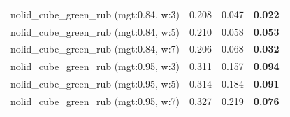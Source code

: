 \begin{table}[H]
{\begin{tabular}{l ccc}
        nolid\_cube\_green\_rub (mgt:0.84, w:3) & 0.208 & 0.047 & \textbf{0.022} \\
        nolid\_cube\_green\_rub (mgt:0.84, w:5) & 0.210 & 0.058 & \textbf{0.053} \\
        nolid\_cube\_green\_rub (mgt:0.84, w:7) & 0.206 & 0.068 & \textbf{0.032} \\
        nolid\_cube\_green\_rub (mgt:0.95, w:3) & 0.311 & 0.157 & \textbf{0.094} \\
        nolid\_cube\_green\_rub (mgt:0.95, w:5) & 0.314 & 0.184 & \textbf{0.091} \\
        nolid\_cube\_green\_rub (mgt:0.95, w:7) & 0.327 & 0.219 & \textbf{0.076} \\
        \bottomrule
    \end{tabular}
    }
\end{table}
